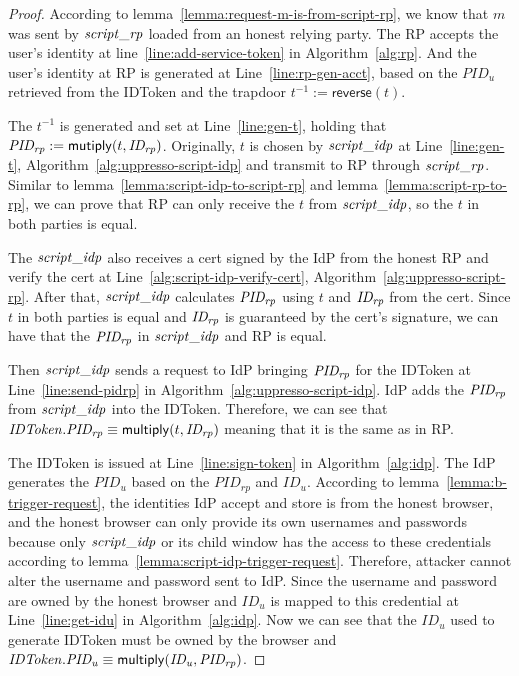   \begin{proof}
    According to lemma~\ref{lemma:request-m-is-from-script-rp}, 
    we know that $m$ was sent by $\mathit{script\_rp}$ loaded from an honest relying party. 
    The RP accepts the user's identity at line~\ref{line:add-service-token} in Algorithm~\ref{alg:rp}.
    And the user's identity at RP is generated at Line~\ref{line:rp-gen-acct}, 
    based on the $PID_u$ retrieved from the IDToken and the trapdoor $t^{-1} := \mathsf{reverse}(t)$. 
    
    The $t^{-1}$ is generated and set at Line~\ref{line:gen-t}, 
    holding that $\mathit{PID_{rp}} := \mathsf{mutiply}(t, \mathit{ID_{rp}})$.
    Originally, $t$ is chosen by $\mathit{script\_idp}$ at Line~\ref{line:gen-t}, Algorithm~\ref{alg:uppresso-script-idp} 
    and transmit to RP through $\mathit{script\_rp}$.
    Similar to lemma~\ref{lemma:script-idp-to-script-rp} and lemma~\ref{lemma:script-rp-to-rp}, 
    we can prove that RP can only receive the $t$ from $\mathit{script\_idp}$, so the $t$ in both parties is equal.

    The $\mathit{script\_idp}$ also receives a cert signed by the IdP from the honest RP and verify the cert at Line~\ref{alg:script-idp-verify-cert}, Algorithm~\ref{alg:uppresso-script-rp}.
    After that, $\mathit{script\_idp}$ calculates $\mathit{PID_{rp}}$ using $t$ and $\mathit{ID_{rp}}$ from the cert.
    Since $t$ in both parties is equal and $\mathit{ID_{rp}}$ is guaranteed by the cert's signature, 
    we can have that the $\mathit{PID_{rp}}$ in $\mathit{script\_idp}$ and RP is equal.

    Then $\mathit{script\_idp}$ sends a request to IdP bringing $\mathit{PID_{rp}}$ for the IDToken 
    at Line~\ref{line:send-pidrp} in Algorithm~\ref{alg:uppresso-script-idp}.
    IdP adds the $\mathit{PID_{rp}}$ from $\mathit{script\_idp}$ into the IDToken.
    Therefore, we can see that 
    $\mathit{IDToken}.\mathit{PID_{rp}} \equiv \mathsf{multiply}(t, \mathit{ID_{rp}})$ meaning that it is the same as in RP.


    The IDToken is issued at Line~\ref{line:sign-token} in Algorithm~\ref{alg:idp}.
    The IdP generates the $PID_u$ based on the $PID_{rp}$ and $ID_u$.
    According to lemma~\ref{lemma:b-trigger-request}, 
    the identities IdP accept and store is from the honest browser, 
    and the honest browser can only provide its own usernames and passwords 
    because only $\mathit{script\_idp}$ or its child window has the access to these credentials 
    according to lemma~\ref{lemma:script-idp-trigger-request}.
    Therefore, attacker cannot alter the username and password sent to IdP.
    Since the username and password are owned by the honest browser and 
    $ID_u$ is mapped to this credential at Line~\ref{line:get-idu} in Algorithm~\ref{alg:idp}. 
    Now we can see that the $ID_u$ used to generate IDToken must be owned by the browser 
    and $\mathit{IDToken}.\mathit{PID_{u}} \equiv \mathsf{multiply}(\mathit{ID_u}, \mathit{PID_{rp}})$.
    


\end{proof}
